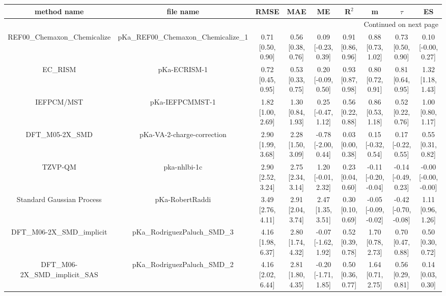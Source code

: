 \documentclass{article}
\begin{document}
\begin{center}
\scriptsize
\begin{longtable}{|ccccccccc|}
\toprule
                   method name &                             file name &               RMSE &                MAE &                   ME &              R$^2$ &                     m &                $\tau$ &                    ES \\
\midrule
\endhead
\midrule
\multicolumn{9}{r}{{Continued on next page}} \\
\midrule
\endfoot

\bottomrule
\endlastfoot
    REF00_Chemaxon_Chemicalize &  pKa\_REF00\_Chemaxon\_Chemicalize\_1 &  0.71 [0.50, 0.90] &  0.56 [0.38, 0.76] &   0.09 [-0.23, 0.39] &  0.91 [0.86, 0.96] &     0.88 [0.73, 1.02] &     0.73 [0.50, 0.90] &    0.10 [-0.00, 0.27] \\
                       EC_RISM &                          pKa-ECRISM-1 &  0.72 [0.45, 0.95] &  0.53 [0.33, 0.75] &   0.20 [-0.09, 0.50] &  0.93 [0.87, 0.98] &     0.80 [0.72, 0.91] &     0.81 [0.64, 0.95] &     1.32 [1.18, 1.43] \\
                    IEFPCM/MST &                       pKa-IEFPCMMST-1 &  1.82 [1.00, 2.69] &  1.30 [0.84, 1.93] &   0.25 [-0.47, 1.12] &  0.56 [0.22, 0.88] &     0.86 [0.53, 1.18] &     0.52 [0.22, 0.76] &     1.00 [0.80, 1.17] \\
                DFT_M05-2X_SMD &            pKa-VA-2-charge-correction &  2.90 [1.99, 3.68] &  2.28 [1.50, 3.09] &  -0.78 [-2.00, 0.44] &  0.03 [0.00, 0.38] &    0.15 [-0.32, 0.54] &    0.17 [-0.22, 0.55] &     0.55 [0.31, 0.82] \\
                       TZVP-QM &                          pka-nhlbi-1c &  2.90 [2.52, 3.24] &  2.75 [2.34, 3.14] &   1.20 [-0.01, 2.32] &  0.23 [0.04, 0.60] &  -0.11 [-0.20, -0.04] &   -0.14 [-0.49, 0.23] &  -0.00 [-0.00, -0.00] \\
     Standard Gaussian Process &                       pKa-RobertRaddi &  3.49 [2.76, 4.11] &  2.91 [2.04, 3.74] &    2.47 [1.35, 3.51] &  0.30 [0.10, 0.69] &  -0.05 [-0.09, -0.02] &  -0.42 [-0.70, -0.08] &     1.11 [0.96, 1.26] \\
       DFT_M06-2X_SMD_implicit &          pKa\_RodriguezPaluch\_SMD\_3 &  4.16 [1.98, 6.37] &  2.80 [1.74, 4.32] &  -0.07 [-1.62, 1.92] &  0.52 [0.39, 0.78] &     1.70 [0.78, 2.73] &     0.70 [0.47, 0.88] &     0.50 [0.30, 0.72] \\
   DFT_M06-2X_SMD_implicit_SAS &          pKa\_RodriguezPaluch\_SMD\_2 &  4.16 [2.02, 6.44] &  2.81 [1.80, 4.35] &  -0.20 [-1.71, 1.85] &  0.50 [0.36, 0.77] &     1.64 [0.71, 2.75] &     0.56 [0.29, 0.81] &     0.14 [0.03, 0.30] \\

\end{longtable}
\end{center}
\end{document}
